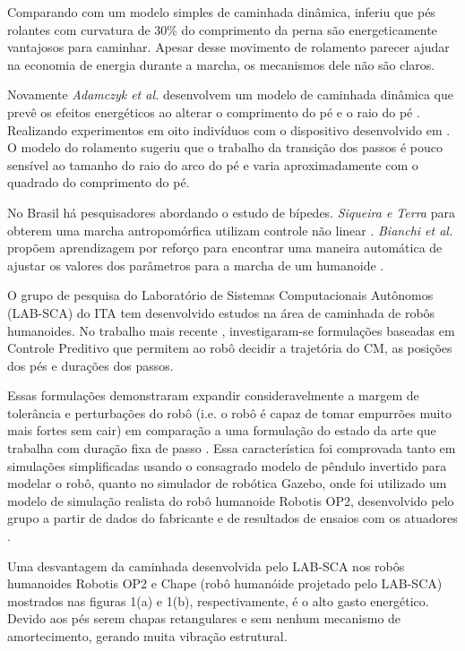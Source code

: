 Comparando com um modelo simples de caminhada dinâmica, inferiu que pés rolantes com curvatura de 30\% do comprimento da perna  são energeticamente vantajosos para caminhar. Apesar desse movimento de rolamento parecer ajudar na economia de energia durante a marcha, os mecanismos dele não são claros. 

Novamente \textit{Adamczyk et al.} desenvolvem um modelo de caminhada dinâmica que prevê os efeitos energéticos ao alterar o comprimento do pé e o raio do pé \cite{adamczyk2013}. Realizando experimentos em oito indivíduos com o dispositivo desenvolvido em \cite{adamczyk2006}. O modelo do rolamento sugeriu que o trabalho da transição dos passos é pouco sensível ao tamanho do raio do arco do pé e varia aproximadamente com o quadrado do comprimento do pé.

No Brasil há pesquisadores abordando o estudo de bípedes. \textit{Siqueira e Terra} para obterem uma marcha antropomórfica utilizam controle não linear  \cite{terra2006} . \textit{Bianchi et al.} propõem aprendizagem por reforço para encontrar uma maneira automática de ajustar os valores dos parâmetros para a marcha de um humanoide \cite{bianchi2017}. 

O grupo de pesquisa do Laboratório de Sistemas Computacionais Autônomos (LAB-SCA) do ITA tem desenvolvido estudos na área de caminhada de robôs humanoides\cite{max22,max25,max27,max28,tesemarcos}.
No trabalho mais recente \cite{tesemarcos}, investigaram-se formulações baseadas em  Controle Preditivo  que permitem ao robô decidir a trajetória do CM, as posições dos pés e durações dos passos.

 Essas formulações demonstraram expandir consideravelmente a margem de tolerância e perturbações do robô (i.e. o robô é capaz de tomar empurrões muito mais fortes sem cair) em comparação a uma formulação do estado da arte que trabalha com duração fixa de passo \cite{max30}. Essa característica foi comprovada tanto em simulações simplificadas usando o consagrado modelo de pêndulo invertido \cite{kajita2001} para modelar o robô, quanto no simulador de robótica Gazebo, onde foi utilizado um modelo de simulação realista do robô humanoide Robotis OP2, desenvolvido pelo grupo a partir de dados do fabricante e de resultados de ensaios com os atuadores \cite{max27}. 
 
Uma desvantagem da caminhada desenvolvida pelo LAB-SCA nos robôs humanoides Robotis OP2 e Chape (robô humanóide projetado pelo LAB-SCA) mostrados nas figuras 1(a) e 1(b), respectivamente, é o alto gasto energético. Devido aos pés serem chapas retangulares e sem nenhum mecanismo de amortecimento, gerando muita vibração estrutural. 


